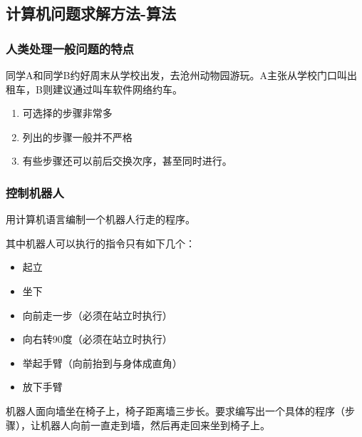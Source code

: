 \subsection{计算机问题求解方法-算法}

\begin{frame}
    \frametitle{人类处理一般问题的特点}
    \begin{blankblock}{}
        同学A和同学B约好周末从学校出发，去沧州动物园游玩。A主张从学校门口叫出租车，B则建议通过叫车软件网络约车。
    \end{blankblock}
    \begin{enumerate}
      \item 可选择的步骤非常多
      \item 列出的步骤一般并不严格
      \item 有些步骤还可以前后交换次序，甚至同时进行。
    \end{enumerate}
\end{frame}

\begin{frame}
    \frametitle{控制机器人}
    用计算机语言编制一个机器人行走的程序。

其中机器人可以执行的指令只有如下几个：
\begin{itemize}
    \item 起立
    \item 坐下
    \item 向前走一步（必须在站立时执行）
    \item 向右转90度（必须在站立时执行）
    \item 举起手臂（向前抬到与身体成直角）
    \item 放下手臂
\end{itemize}

机器人面向墙坐在椅子上，椅子距离墙三步长。要求编写出一个具体的程序（步骤），让机器人向前一直走到墙，然后再走回来坐到椅子上。

\end{frame}

